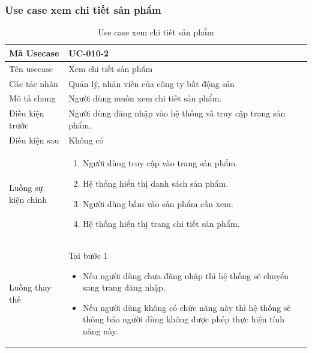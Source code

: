 \documentclass[12pt,a4paper]{article}
\begin{document}
    \subsubsection*{Use case xem chi tiết sản phẩm }
    \begin{table}[H]
        \centering
        \begin{tabular}{|p{3.5cm}|p{11.5cm}|c|}
            \hline
            Mã Usecase      & UC-010-2                                                      \\
            \hline
            Tên usecase     & Xem chi tiết sản phẩm                                         \\
            \hline
            Các tác nhân    & Quản lý, nhân viên của công ty bất động sản                   \\
            \hline
            Mô tả chung     & Người dùng muốn xem chi tiết sản phẩm.                        \\
            \hline

            Điều kiện trước & Người dùng đăng nhập vào hệ thống và truy cập trang sản phẩm. \\
            \hline

            Điều kiện sau   & Không có                                                      \\
            \hline

            Luồng sự kiện chính & \vspace{-.8cm}\begin{enumerate}
                                                    \item Người dùng truy cập vào trang sản phẩm.
                                                    \item Hệ thống hiển thị danh sách sản phẩm.
                                                    \item Người dùng bấm vào sản phẩm cần xem.
                                                    \item Hệ thống hiển thị trang chi tiết sản phẩm.
            \end{enumerate}
            \\
            \hline
            Luồng thay thế & Tại bước 1\newline
            \vspace{-.8cm}\begin{itemize}
                              \item Nếu người dùng chưa đăng nhập thì hệ thống sẽ chuyển sang trang đăng nhập.
                              \item  Nếu người dùng không có chức năng này thì hệ thống sẽ thông báo người dùng không được phép thực hiện tính năng này.
            \end{itemize}

            \\    \hline
        \end{tabular}
        \caption{Use case xem chi tiết sản phẩm }
    \end{table}
\end{document}
